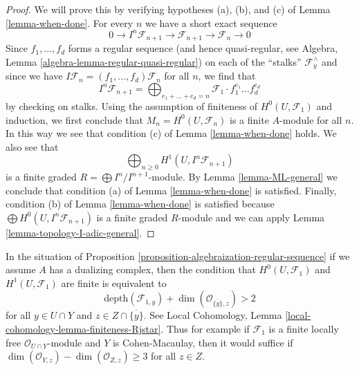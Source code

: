 \begin{proof}
We will prove this by verifying hypotheses (a), (b), and (c) of
Lemma \ref{lemma-when-done}.
For every $n$ we have a short exact sequence
$$
0 \to I^n\mathcal{F}_{n + 1} \to \mathcal{F}_{n + 1} \to \mathcal{F}_n \to 0
$$
Since $f_1, \ldots, f_d$ forms a regular sequence (and hence
quasi-regular, see Algebra, Lemma \ref{algebra-lemma-regular-quasi-regular})
on each of the ``stalks'' $\mathcal{F}_y^\wedge$ and since we have
$I\mathcal{F}_n = (f_1, \ldots, f_d)\mathcal{F}_n$ for all $n$,
we find that
$$
I^n\mathcal{F}_{n + 1} =
\bigoplus\nolimits_{e_1 + \ldots + e_d = n} \mathcal{F}_1 \cdot
f_1^{e_1} \ldots f_d^{e_d}
$$
by checking on stalks. Using the assumption of finiteness of
$H^0(U, \mathcal{F}_1)$ and induction, we first conclude that
$M_n = H^0(U, \mathcal{F}_n)$ is a finite $A$-module for all $n$.
In this way we see that condition (c) of Lemma \ref{lemma-when-done} holds.
We also see that
$$
\bigoplus\nolimits_{n \geq 0} H^1(U, I^n\mathcal{F}_{n + 1})
$$
is a finite graded $R = \bigoplus I^n/I^{n +1}$-module.
By Lemma \ref{lemma-ML-general} we conclude that condition (a) of
Lemma \ref{lemma-when-done} is satisfied. Finally, condition (b) of
Lemma \ref{lemma-when-done} is satisfied because
$\bigoplus H^0(U, I^n\mathcal{F}_{n + 1})$ is a finite graded $R$-module
and we can apply Lemma \ref{lemma-topology-I-adic-general}.
\end{proof}

\begin{remark}
\label{remark-interesting-case-ter}
In the situation of
Proposition \ref{proposition-algebraization-regular-sequence}
if we assume $A$ has a dualizing complex, then
the condition that $H^0(U, \mathcal{F}_1)$ and
$H^1(U, \mathcal{F}_1)$ are finite is equivalent to
$$
\text{depth}(\mathcal{F}_{1, y}) +
\dim(\mathcal{O}_{\overline{\{y\}}, z}) > 2
$$
for all $y \in U \cap Y$ and $z \in Z \cap \overline{\{y\}}$.
See Local Cohomology, Lemma \ref{local-cohomology-lemma-finiteness-Rjstar}.
Thus for example if $\mathcal{F}_1$ is a finite locally free
$\mathcal{O}_{U \cap Y}$-module and $Y$ is Cohen-Macaulay,
then it would suffice if
$\dim(\mathcal{O}_{Y, z}) - \dim(\mathcal{O}_{Z, z}) \geq 3$
for all $z \in Z$.
\end{remark}

